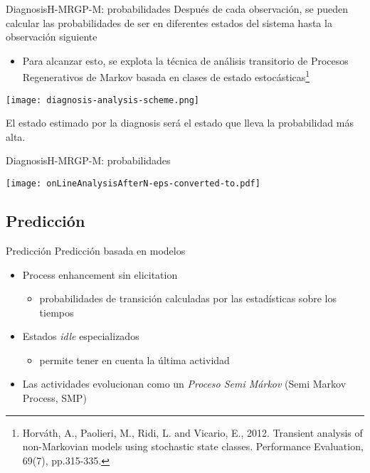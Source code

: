 \documentclass[9pt, handout]{beamer}
\begin{document}
      \begin{frame}{Diagnosis}{H-MRGP-M: probabilidades}
        Después de cada observación, se pueden calcular las probabilidades de ser en diferentes estados del sistema hasta la observación siguiente
        \begin{itemize}
          \item Para alcanzar esto, se explota la técnica de análisis transitorio de Procesos Regenerativos de Markov basada en clases de estado estocásticas\footnote{Horváth, A., Paolieri, M., Ridi, L. and Vicario, E., 2012. Transient analysis of non-Markovian models using stochastic state classes. Performance Evaluation, 69(7), pp.315-335.}
        \end{itemize}
        
        \begin{center}
          \texttt{[image: diagnosis-analysis-scheme.png]}
        \end{center}
        
        El estado estimado por la diagnosis será el estado que lleva la probabilidad más alta.
      \end{frame}
      
      \begin{frame}{Diagnosis}{H-MRGP-M: probabilidades}
        \begin{center}
          \texttt{[image: onLineAnalysisAfterN-eps-converted-to.pdf]}
        \end{center}
      \end{frame}
      
    \subsection{Predicción}
      \begin{frame}{Predicción}
        Predicción basada en modelos
        \begin{itemize}
          \item Process enhancement sin elicitation
          \begin{itemize}
            \item probabilidades de transición calculadas por las estadísticas sobre los tiempos
          \end{itemize}
          \item Estados \textit{idle} especializados
          \begin{itemize}
            \item permite tener en cuenta la última actividad
          \end{itemize}
          \item Las actividades evolucionan como un \textit{Proceso Semi Márkov} (Semi Markov Process, SMP)
        \end{itemize}
        
      	\begin{figure}[center]
      		\scalebox{0.7}{}
      	\end{figure}
      \end{frame}
      
\end{document}
